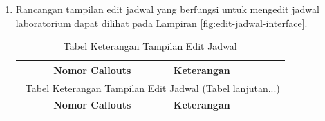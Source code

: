 \begin{enumerate}
	\item Rancangan tampilan edit jadwal yang berfungsi untuk mengedit jadwal laboratorium dapat dilihat pada Lampiran \ref{fig:edit-jadwal-interface}.

	      {
	      \selectfont
	      \begin{longtable}{c p{}}
		      \caption{Tabel Keterangan Tampilan Edit Jadwal}
		      \label{tab:edit-jadwal}                                                                                                                                                                 \\
		      \hline
		      \textbf{Nomor Callouts} & \textbf{Keterangan}                                                                                                                                           \\
		      \hline
		      \endfirsthead

		      \multicolumn{2}{c}{\selectfont \thetable\ {Tabel Keterangan Tampilan Edit Jadwal} \space (Tabel lanjutan...)}                                                                           \\
		      \hline
		      \textbf{Nomor Callouts} & \textbf{Keterangan}                                                                                                                                           \\
		      \hline
		      \endhead


\end{longtable}}
\end{enumerate}
